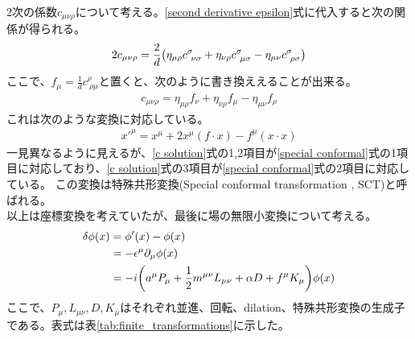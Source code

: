 \documentclass[11pt, dvipdfmx]{article}
\numberwithin{equation}{section}
\newcommand{\blankline}{\par\vspace{\baselineskip}} %
\begin{document}
\blankline
  2次の係数$c_{\mu\nu\rho}$について考える。\eqref{second derivative epsilon}式に代入すると次の関係が得られる。
\begin{align}
    2c_{\mu\nu\rho} = \frac{2}{d}\qty(\eta_{\mu\rho}c^\sigma_{\ \nu\sigma} + \eta_{\nu\rho}c^\sigma_{\ \mu\sigma} - \eta_{\mu\nu}c^\sigma_{\ \rho\sigma})\label{c condition}
\end{align}
ここで、$f_\mu=\frac{1}{d}c^\rho_{\ \rho\mu}$と置くと、次のように書き換ええることが出来る。
\begin{align}
    c_{\mu\nu\rho} = \eta_{\mu\rho}f_\nu + \eta_{\nu\rho}f_\mu - \eta_{\mu\nu}f_\rho\label{c solution}
\end{align}
これは次のような変換に対応している。
\begin{align}
    x'^\mu=x^\mu + 2x^\mu (f\cdot x) - f^\mu (x\cdot x)\label{special conformal}
\end{align}
一見異なるように見えるが、\eqref{c solution}式の1,2項目が\eqref{special conformal}式の1項目に対応しており、\eqref{c solution}式の3項目が\eqref{special conformal}式の2項目に対応している。
この変換は特殊共形変換(Special conformal transformation , SCT)と呼ばれる。\\
以上は座標変換を考えていたが、最後に場の無限小変換について考える。
\begin{align}
    \delta \phi(x) &= \phi'(x) - \phi(x)\\
    &=- \epsilon^\mu \partial_\mu \phi(x)\\
    &= -i \qty(a^\mu P_\mu + \frac{1}{2}m^{\mu\nu}L_{\mu\nu} + \alpha D+f^\mu K_\mu)\phi(x)
\end{align}
ここで、$P_\mu,L_{\mu\nu},D,K_\mu$はそれぞれ並進、回転、dilation、特殊共形変換の生成子である。表式は表\ref{tab:finite_transformations}に示した。
\end{document}
